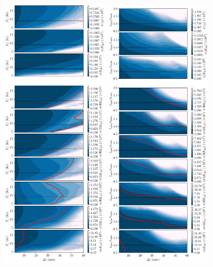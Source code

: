 \begin{figure}
  \centering
  \includegraphics[width=0.49\textwidth]{figs/cad-period.pdf}\hfill
  \includegraphics[width=0.49\textwidth]{figs/cad-speed.pdf}

\end{figure}
